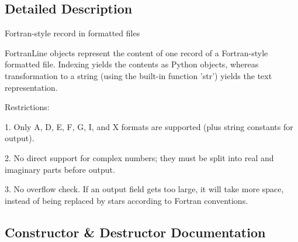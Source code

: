 \subsection{Detailed Description}
\begin{DoxyVerb}Fortran-style record in formatted files

FortranLine objects represent the content of one record of a
Fortran-style formatted file. Indexing yields the contents as
Python objects, whereas transformation to a string (using the
built-in function 'str') yields the text representation.

Restrictions:

  1. Only A, D, E, F, G, I, and X formats are supported (plus string
     constants for output).

  2. No direct support for complex numbers; they must be split into
     real and imaginary parts before output.

  3. No overflow check. If an output field gets too large, it will
     take more space, instead of being replaced by stars according
     to Fortran conventions.
\end{DoxyVerb}
 

\subsection{Constructor \& Destructor Documentation}
\hypertarget{classpyneb_1_1utils_1_1_fortran_format_1_1_fortran_line_ac775ee34451fdfa742b318538164070e}{}
